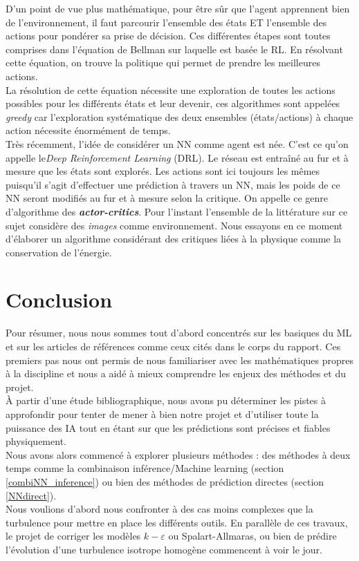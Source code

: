 \documentclass[a4paper,12pt]{article}
\newcommand{\keps}{$k-\varepsilon$}
\newcommand\bk{\color{black}}
\newcommand\navy{\color{navy}}
\numberwithin{equation}{section} %
\begin{document}
 \noindent D'un point de vue plus mathématique, pour être sûr que l'agent apprennent bien de l'environnement, il faut parcourir l'ensemble des états ET l'ensemble des actions pour pondérer sa prise de décision. Ces différentes étapes sont toutes comprises dans l'équation de Bellman sur laquelle est basée le RL. En résolvant cette équation, on trouve la politique qui permet de prendre les meilleures actions. \\
La résolution de cette équation nécessite une exploration de toutes les actions possibles pour les différents états et leur devenir, ces algorithmes sont appelées \textit{greedy} car l'exploration systématique des deux ensembles (états/actions) à chaque action nécessite énormément de temps. \\

\noindent Très récemment, l'idée de considérer un NN comme agent est née. C'est ce qu'on appelle le\textit{Deep Reinforcement Learning} (DRL). Le réseau est entraîné au fur et à mesure que les états sont explorés. Les actions sont ici toujours les mêmes puisqu'il s'agit d'effectuer une prédiction à travers un NN, mais les poids de ce NN seront modifiés au fur et à mesure selon la critique. On appelle ce genre d'algorithme des \textbf{\textit{actor-critics}}.
\noindent Pour l'instant l'ensemble de la littérature sur ce sujet considère des \textit{images} comme environnement. Nous essayons en ce moment d'élaborer un algorithme considérant des critiques liées à la physique comme la conservation de l'énergie.

\pagebreak

\navy \section{Conclusion} \bk
\noindent Pour résumer, nous nous sommes tout d'abord concentrés sur les basiques du ML et sur les articles de références comme ceux cités dans le corps du rapport. Ces premiers pas nous ont permis de nous familiariser avec les mathématiques propres à la discipline et nous a aidé à mieux comprendre les enjeux des méthodes et du projet.\\

\noindent À partir d'une étude bibliographique, nous avons pu déterminer les pistes à approfondir pour tenter de mener à bien notre projet et d'utiliser toute la puissance des IA tout en étant sur que les prédictions sont précises et fiables physiquement.\\
Nous avons alors commencé à explorer plusieurs méthodes : des méthodes à deux temps comme la combinaison inférence/Machine learning (section \eqref{combiNN_inference}) ou bien des méthodes de prédiction directes (section \eqref{NNdirect}). \\
Nous voulions d'abord nous confronter à des cas moins complexes que la turbulence pour mettre en place les différents outils. En parallèle de ces travaux, le projet de corriger les modèles \keps $ $ ou Spalart-Allmaras, ou bien de prédire l'évolution d'une turbulence isotrope homogène commencent à voir le jour.\\
	
\end{document}
